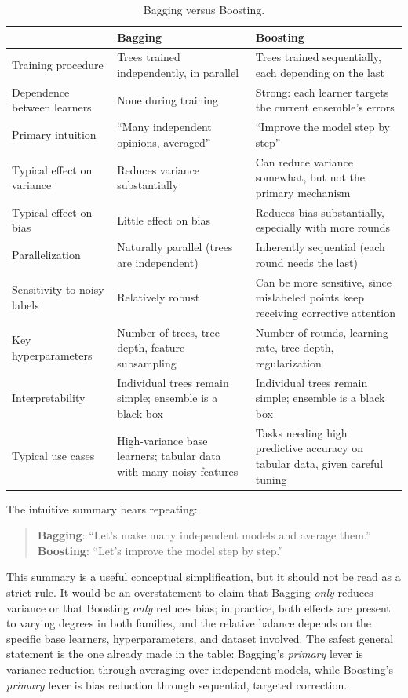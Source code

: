 \documentclass[12pt,a4paper]{article}
\begin{document}
\begin{table}[h]
\centering
\caption{Bagging versus Boosting.}
\label{tab:bagging-vs-boosting}
\begin{tabular}{@{}p{}p{}p{}@{}}
\toprule
& \textbf{Bagging} & \textbf{Boosting} \\
\midrule
Training procedure & Trees trained independently, in parallel & Trees trained sequentially, each depending on the last \\
Dependence between learners & None during training & Strong: each learner targets the current ensemble's errors \\
Primary intuition & ``Many independent opinions, averaged'' & ``Improve the model step by step'' \\
Typical effect on variance & Reduces variance substantially & Can reduce variance somewhat, but not the primary mechanism \\
Typical effect on bias & Little effect on bias & Reduces bias substantially, especially with more rounds \\
Parallelization & Naturally parallel (trees are independent) & Inherently sequential (each round needs the last) \\
Sensitivity to noisy labels & Relatively robust & Can be more sensitive, since mislabeled points keep receiving corrective attention \\
Key hyperparameters & Number of trees, tree depth, feature subsampling & Number of rounds, learning rate, tree depth, regularization \\
Interpretability & Individual trees remain simple; ensemble is a black box & Individual trees remain simple; ensemble is a black box \\
Typical use cases & High-variance base learners; tabular data with many noisy features & Tasks needing high predictive accuracy on tabular data, given careful tuning \\
\bottomrule
\end{tabular}
\end{table}

The intuitive summary bears repeating:
\begin{quote}
\textbf{Bagging}: ``Let's make many independent models and average them.'' \\
\textbf{Boosting}: ``Let's improve the model step by step.''
\end{quote}
This summary is a useful conceptual simplification, but it should not be read as a strict rule. It would be an overstatement to claim that Bagging \emph{only} reduces variance or that Boosting \emph{only} reduces bias; in practice, both effects are present to varying degrees in both families, and the relative balance depends on the specific base learners, hyperparameters, and dataset involved. The safest general statement is the one already made in the table: Bagging's \emph{primary} lever is variance reduction through averaging over independent models, while Boosting's \emph{primary} lever is bias reduction through sequential, targeted correction.
\end{document}
